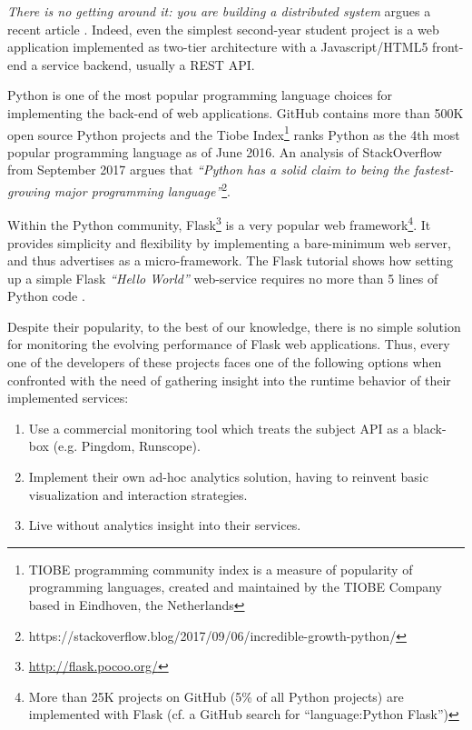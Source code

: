 {\em There is no getting around it: you are building a distributed system} argues a recent article \cite{cavage2013there}. Indeed, even the simplest second-year student project is a web application implemented as two-tier architecture with a Javascript/HTML5 front-end a service backend, usually a REST API.

Python is one of the most popular programming language choices for implementing the back-end of web applications. GitHub contains more than 500K open source Python projects and the Tiobe Index\footnote{TIOBE programming community index is a measure of popularity of programming languages, created and maintained by the TIOBE Company based in Eindhoven, the Netherlands} ranks Python as the 4th most popular programming language as of June 2016. An analysis of  StackOverflow from September 2017 argues that {\em ``Python has a solid claim to being the fastest-growing major programming language''}\footnote{https://stackoverflow.blog/2017/09/06/incredible-growth-python/}.
 
Within the Python community, Flask\footnote{\url{http://flask.pocoo.org/}} is a very popular web framework\footnote{More than 25K projects on GitHub (5\% of all Python projects) are implemented with Flask (cf. a GitHub search for ``language:Python Flask'')}. It provides simplicity and flexibility by implementing a bare-minimum web server, and thus advertises as a micro-framework. The Flask tutorial shows how setting up a simple Flask {\em ``Hello World''} web-service requires no more than 5 lines of Python code \cite{ flask:tutorial}.
 
Despite their popularity, to the best of our knowledge, there is no simple solution for monitoring the evolving performance of Flask web applications. Thus, every one of the developers of these projects faces one of the following options when confronted with the need of gathering insight into the runtime behavior of their implemented services: 

  \begin{enumerate}

    \item Use a commercial monitoring tool which treats the subject API as a black-box (e.g. Pingdom, Runscope). 

    \item Implement their own ad-hoc analytics solution, having to reinvent basic visualization and interaction strategies. 

    \item Live without analytics insight into their services.

  \end{enumerate}

